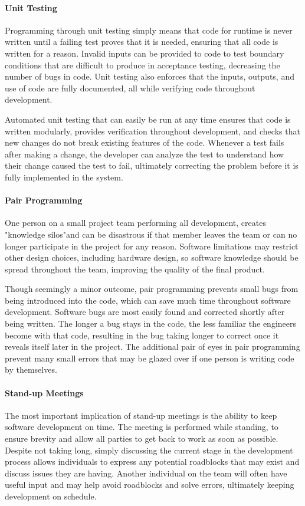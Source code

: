 \paragraph{Unit Testing}
Programming through unit testing simply means that code for runtime is never written until a failing test proves that it is needed, ensuring that all code is written for a reason.
Invalid inputs can be provided to code to test boundary conditions that are difficult to produce in acceptance testing, decreasing the number of bugs in code.
Unit testing also enforces that the inputs, outputs, and use of code are fully documented, all while verifying code throughout development. 

Automated unit testing that can easily be run at any time ensures that code is written modularly, provides verification throughout development, and checks that new changes do not break existing features of the code.
Whenever a test fails after making a change, the developer can analyze the test to understand how their change caused the test to fail, ultimately correcting the problem before it is fully implemented in the system. 
\paragraph{Pair Programming}
One person on a small project team performing all development, creates "knowledge silos"and can be disastrous if that member leaves the team or can no longer participate in the project for any reason.
Software limitations may restrict other design choices, including hardware design, so software knowledge should be spread throughout the team, improving the quality of the final product. 

Though seemingly a minor outcome, pair programming prevents small bugs from being introduced into the code, which can save much time throughout software development.
Software bugs are most easily found and corrected shortly after being written.
The longer a bug stays in the code, the less familiar the engineers become with that code, resulting in the bug taking longer to correct once it reveals itself later in the project.
The additional pair of eyes in pair programming prevent many small errors that may be glazed over if one person is writing code by themselves.
\paragraph{Stand-up Meetings}
The most important implication of stand-up meetings is the ability to keep software development on time.
The meeting is performed while standing, to ensure brevity and allow all parties to get back to work as soon as possible.
Despite not taking long, simply discussing the current stage in the development process allows individuals to express any potential roadblocks that may exist and discuss issues they are having.
Another individual on the team will often have useful input and may help avoid roadblocks and solve errors, ultimately keeping development on schedule. 
